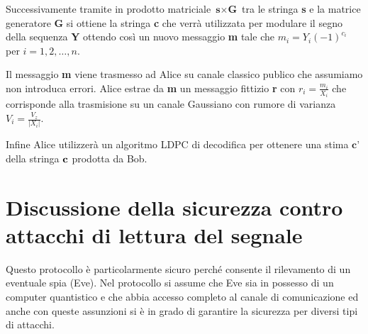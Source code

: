 Successivamente tramite in prodotto matriciale $\textbf{s} \times \textbf{G}$ tra le stringa \textbf{s} e la matrice generatore \textbf{G} si ottiene la stringa \textbf{c} che verr\`a utilizzata per modulare il segno della sequenza \textbf{Y} ottendo cos\`i un nuovo messaggio \textbf{m} tale che $m_i = Y_i(-1)^{c_i}$ per $i = 1,2,\dots,n$.

Il messaggio \textbf{m} viene trasmesso ad Alice su canale classico publico che assumiamo non introduca errori. Alice estrae da \textbf{m} un messaggio fittizio \textbf{r} con $r_i = \frac{m_i}{X_i}$ che corrisponde alla trasmisione su un canale Gaussiano con rumore di varianza $V_i = \frac{V_z}{|X_i|}$.

Infine Alice utilizzer\`a un algoritmo LDPC di decodifica per ottenere una stima $\textbf{c'}$ della stringa $\textbf c$ prodotta da Bob.

\section{Discussione della sicurezza contro attacchi di lettura del segnale}
Questo protocollo \`e particolarmente sicuro perch\'e consente il rilevamento di un eventuale spia (Eve). Nel protocollo si assume che Eve sia in possesso di un computer quantistico e che abbia accesso completo al canale di comunicazione ed anche con queste assunzioni si \`e in grado di garantire la sicurezza per diversi tipi di attacchi.

